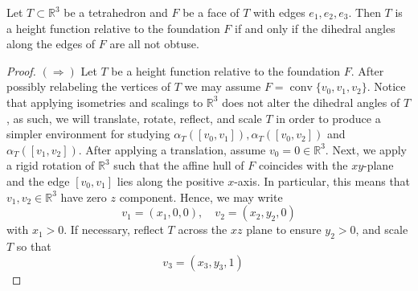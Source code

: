 \documentclass[10pt,a4paper]{amsart}
\begin{document}
\begin{lemma}\label{L1}
	Let $T  \subset \mathbb{R}^3$ be a tetrahedron and $F$ be a face of $T$ with edges $e_1,e_2,e_3$.
	Then $T$ is a height function relative to the foundation $F$ if and only if the dihedral angles along the edges of $F$ are all not obtuse.
\end{lemma}

\begin{proof}
	$(\Rightarrow)$ Let $T$ be a height function relative to the foundation $F$. After possibly relabeling the vertices of $T$ we may assume $F = \operatorname{conv}\{v_0,v_1,v_2\}$. Notice that applying isometries and scalings to $\mathbb{R}^3$ does not alter the dihedral angles of $T$, as such, we will translate, rotate, reflect, and scale $T$ in order to produce a simpler environment for studying $\alpha_T([v_0,v_1]), \alpha_T([v_0,v_2])$ and $\alpha_T([v_1,v_2])$. After applying a translation, assume $v_0 = 0 \in \mathbb{R}^3$. Next, we apply a rigid rotation of $\mathbb{R}^3$ such that the affine hull of $F$ coincides with the $xy$-plane and the edge $[v_0,v_1]$ lies along the positive $x$-axis. In particular, this means that $v_1,v_2 \in \mathbb{R}^3$ have zero $z$ component. Hence, we may write
	\begin{equation*}
		v_1 = (x_1,0,0), \quad v_2 = (x_2,y_2,0)
	\end{equation*}
	with $x_1>0$. If necessary, reflect $T$ across the $xz$ plane to ensure $y_2>0$, and scale $T$ so that
	\begin{equation*}
		v_3 = (x_3,y_3,1)\quad
	\end{equation*}
	

\end{proof}
\end{document}
